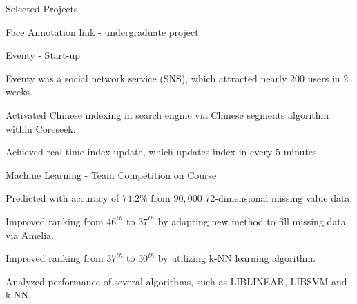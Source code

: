 \documentclass{cv}
\begin{document}
\begin{cvSection}{Selected Projects}
\begin{projectSubsection}{Face Annotation \href{http://cmlab.csie.ntu.edu.tw/~pi/face_annotation}{link}}{ - }{undergraduate project}
\end{projectSubsection}

\begin{projectSubsection}{Eventy}{ - }{Start-up}

\item Eventy was a social network service (SNS), which attracted nearly 200 users in 2 weeks.
\item Activated Chinese indexing in search engine via Chinese segments algorithm within Coreseek.
\item Achieved real time index update, which updates index in every 5 minutes.

\end{projectSubsection}


\begin{projectSubsection}{Machine Learning}{ - }{Team Competition on Course}

\item Predicted with accuracy of $74.2\%$ from $90,000$ 72-dimensional missing value data.
\item Improved ranking from $46^{th}$ to $37^{th}$ by adapting new method to fill missing data via Amelia.
\item Improved ranking from $37^{th}$ to $30^{th}$ by utilizing k-NN learning algorithm.
\item Analyzed performance of several algorithms, such as LIBLINEAR, LIBSVM and k-NN.

\end{projectSubsection}

\end{cvSection}





\end{document}
